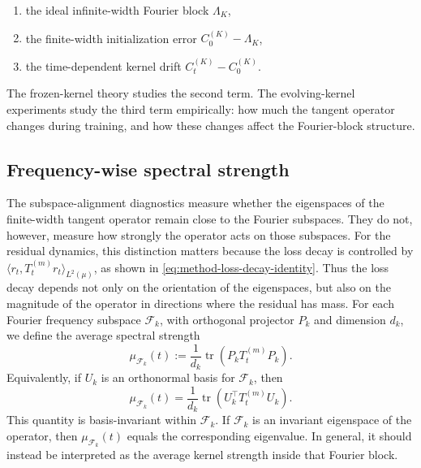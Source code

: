 \begin{enumerate}
	\item the ideal infinite-width Fourier block \(\Lambda_K\),
	\item the finite-width initialization error \(C_0^{(K)}-\Lambda_K\),
	\item the time-dependent kernel drift \(C_t^{(K)}-C_0^{(K)}\).
\end{enumerate}

The frozen-kernel theory studies the second term. The evolving-kernel
experiments study the third term empirically: how much the tangent operator
changes during training, and how these changes affect the Fourier-block
structure.

\subsection{Frequency-wise spectral strength}
\label{subsec:method-spectral-strength}

The subspace-alignment diagnostics measure whether the eigenspaces of the
finite-width tangent operator remain close to the Fourier subspaces. They do
not, however, measure how strongly the operator acts on those subspaces.
For the residual dynamics, this distinction matters because the loss decay is
controlled by \(\langle r_t,T_t^{(m)}r_t\rangle_{L^2(\mu)}\), as shown in
\eqref{eq:method-loss-decay-identity}. Thus the loss decay depends not only on
the orientation of the eigenspaces, but also on the magnitude of the operator in
directions where the residual has mass.
For each Fourier frequency subspace \(\mathcal F_k\), with orthogonal projector
\(P_k\) and dimension \(d_k\), we define the average spectral strength
\begin{equation}
	\mu_{\mathcal F_k}(t)
	:=
	\frac{1}{d_k}
	\operatorname{tr}\!\left(P_k T_t^{(m)} P_k\right).
	\label{eq:method-frequency-spectral-strength}
\end{equation}
Equivalently, if \(U_k\) is an orthonormal basis for \(\mathcal F_k\), then
\begin{equation}
	\mu_{\mathcal F_k}(t)
	=
	\frac{1}{d_k}
	\operatorname{tr}\!\left(U_k^\top T_t^{(m)} U_k\right).
	\label{eq:method-frequency-spectral-strength-basis}
\end{equation}
This quantity is basis-invariant within \(\mathcal F_k\). If \(\mathcal F_k\)
is an invariant eigenspace of the operator, then
\(\mu_{\mathcal F_k}(t)\) equals the corresponding eigenvalue. In general, it
should instead be interpreted as the average kernel strength inside that
Fourier block.

